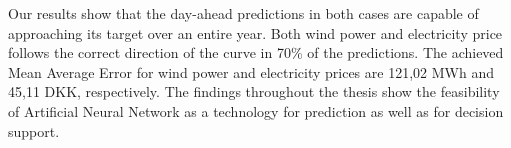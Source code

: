 \noindent Our results show that the day-ahead predictions in both cases are capable of approaching its target over an entire year. Both wind power and electricity price follows the correct direction of the curve in 70\% of the predictions. The achieved Mean Average Error for wind power and electricity prices are 121,02 MWh and 45,11 DKK, respectively. The findings throughout the thesis show the feasibility of Artificial Neural Network as a technology for prediction as well as for decision support.  